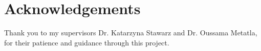
\section*{Acknowledgements}

Thank you to my supervisors Dr. Katarzyna Stawarz and Dr. Oussama Metatla, for their patience and guidance through this project.
